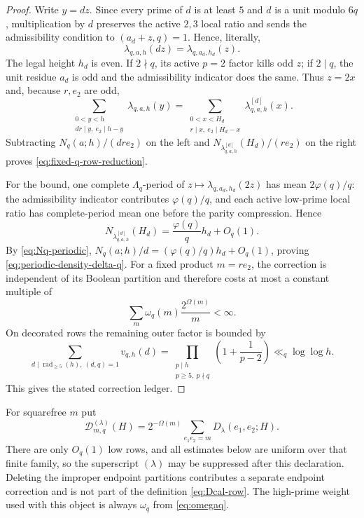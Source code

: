 \documentclass[11pt]{article}
\theoremstyle{definition}
\theoremstyle{remark}
\newcommand{\1}{\mathbf 1}
\newcommand{\ph}{\varphi}
\newcommand{\Om}{\Omega}
\newcommand{\Dcal}{\mathcal D}
\begin{document}
\begin{proof}
Write $y=dz$.  Since every prime of $d$ is at least $5$ and $d$ is a unit
modulo $6q$, multiplication by $d$ preserves the active $2,3$ local ratio and
sends the admissibility condition to $(a_d+z,q)=1$.  Hence, literally,
\[
\lambda_{q,a,h}(dz)=\lambda_{q,a_d,h_d}(z).
\]
The legal height $h_d$ is even.  If $2\nmid q$, its active $p=2$ factor kills
odd $z$; if $2\mid q$, the unit residue $a_d$ is odd and the admissibility
indicator does the same.  Thus $z=2x$ and, because $r,e_2$ are odd,
\[
\sum_{\substack{0<y<h\\dr\mid y,\ e_2\mid h-y}}
\lambda_{q,a,h}(y)
=
\sum_{\substack{0<x<H_d\\r\mid x,\ e_2\mid H_d-x}}
\lambda^{[d]}_{q,a,h}(x).
\]
Subtracting $N_q(a;h)/(dr e_2)$ on the left and
$N_{\lambda^{[d]}_{q,a,h}}(H_d)/(r e_2)$ on the right proves
\eqref{eq:fixed-q-row-reduction}.

For the bound, one complete $\Lambda_q$-period of
$z\mapsto\lambda_{q,a_d,h_d}(2z)$ has mean $2\ph(q)/q$: the admissibility
indicator contributes $\ph(q)/q$, and each active low-prime local ratio has
complete-period mean one before the parity compression.  Hence
\[
N_{\lambda^{[d]}_{q,a,h}}(H_d)
=\frac{\ph(q)}q h_d+O_q(1).
\]
By \eqref{eq:Nq-periodic},
$N_q(a;h)/d=(\ph(q)/q)h_d+O_q(1)$, proving
\eqref{eq:periodic-density-delta-q}.  For a fixed product $m=r e_2$, the
correction is independent of its Boolean partition and therefore costs at
most a constant multiple of
\[
\sum_m \omega_q(m)\frac{2^{\Om(m)}}m<\infty.
\]
On decorated rows the remaining outer factor is bounded by
\[
\sum_{d\mid \operatorname{rad}_{\ge5}(h),\ (d,q)=1}v_{q,h}(d)
=\prod_{\substack{p\mid h\\p\ge5,\ p\nmid q}}
\left(1+\frac1{p-2}\right)
\ll_q\log\log h.
\]
This gives the stated correction ledger.
\end{proof}

For squarefree $m$ put
\begin{equation}\label{eq:Dcal-row}
\boxed{
\Dcal_{m,q}^{(\lambda)}(H)
=2^{-\Om(m)}\sum_{e_1e_2=m}D_\lambda(e_1,e_2;H).
}
\end{equation}
There are only $O_q(1)$ low rows, and all estimates below are uniform over
that finite family, so the superscript $(\lambda)$ may be suppressed after
this declaration.  Deleting the improper endpoint partitions contributes a
separate endpoint correction and is not part of the definition
\eqref{eq:Dcal-row}.  The high-prime weight used with this object is always
$\omega_q$ from \eqref{eq:omegaq}.
\end{document}
